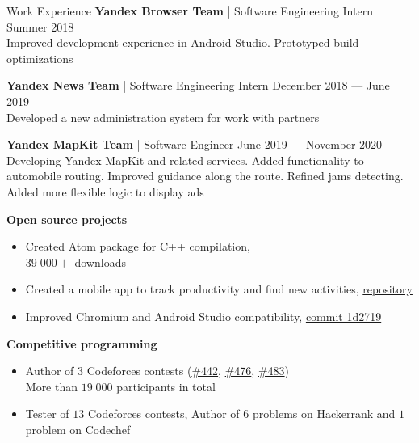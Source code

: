 \documentclass{resume} %
\begin{document}
\begin{rSection}{Work Experience}
    \textbf{Yandex Browser Team} | Software Engineering Intern \hfill{Summer 2018} \\
    Improved development experience in Android Studio. Prototyped build optimizations
    \begin{itemize}\end{itemize} %
    \textbf{Yandex News Team} | Software Engineering Intern \hfill{December 2018 --- June 2019} \\
    Developed a new administration system for work with partners
    \begin{itemize}\end{itemize} %
    \textbf{Yandex MapKit Team} | Software Engineer \hfill{June 2019 --- November 2020} \\
    Developing Yandex MapKit and related services. Added functionality to automobile routing. Improved guidance along the route. Refined jams detecting. Added more flexible logic to display ads
    
    \begin{itemize}
    \end{itemize} %
    \textbf{Open source projects}
    \begin{itemize}
        \item Created Atom package for C++ compilation, \href{ https://atom.io/packages/gpp}{\color{link}{atom.io/packages/gpp}} \\
        $39 \; 000+$ downloads
        \item Created a mobile app to track productivity and find new activities, \href{https://github.com/livace/Tim3r}{\color{link} repository}
        \item Improved Chromium and Android Studio compatibility, \href{https://chromium-review.googlesource.com/c/chromium/src/+/1117077}{\color{link}commit 1d2719}
    \end{itemize}
    \textbf{Competitive programming}
    \begin{itemize}
        \item Author of $3$ Codeforces contests (\href{https://codeforces.com/blog/entry/55324?locale=en}{\color{link}\#442}, 
        \href{https://codeforces.com/blog/entry/59088?locale=en}{\color{link}\#476}, 
        \href{http://codeforces.com/blog/entry/59457?locale=en}{\color{link}\#483})\\
        More than $19 \; 000$ participants in total
        \item Tester of $13$ Codeforces contests, Author of $6$ problems on Hackerrank and $1$ problem on Codechef
    \end{itemize}
\end{rSection}
\end{document}

